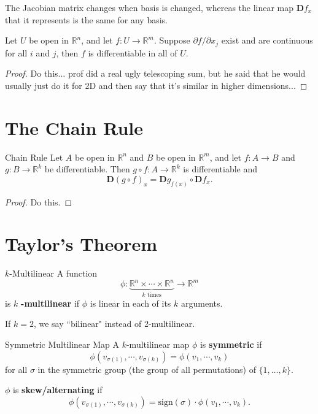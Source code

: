 \documentclass[10pt]{report}
\begin{document}
\begin{note}{}{}
The Jacobian matrix changes when basis is changed, whereas the linear map $\mathbf{D}f_x$ that it represents is the same for any basis.
\end{note}

\begin{thrm}{}{}
Let $U$ be open in $\mathbb{R}^n$, and let $f:U \to \mathbb{R}^m$. Suppose $\partial f / \partial x_j$ exist and are continuous for all $i$ and $j$, then $f$ is differentiable in all of $U$.
\end{thrm}
\begin{proof}
	{\color{red}Do this... prof did a real ugly telescoping sum, but he said that he would usually just do it for 2D and then say that it's similar in higher dimensions...}
\end{proof}


\section{The Chain Rule}

\begin{thrm}{Chain Rule}{}
Let $A$ be open in $\mathbb{R}^n$ and $B$ be open in $\mathbb{R}^m$, and let $f:A\to B$ and $g:B \to \mathbb{R}^k$ be differentiable. Then $g \circ f: A \to \mathbb{R}^k$ is differentiable and
\[
	\mathbf{D}(g \circ f)_x = \mathbf{D}g_{f(x)} \circ \mathbf{D}f_x.
\] 
\end{thrm}
\begin{proof}
	{\color{red}Do this.}
\end{proof}



\section{Taylor's Theorem}

\begin{defn}{$k$-Multilinear}{}
	A function \[\phi: \underbrace{\mathbb{R}^n \times \cdots \times \mathbb{R}^n}_{k \text{ times}} \to \mathbb{R}^m\] is $k$ \textbf{-multilinear} if $\phi$ is linear in each of its $k$ arguments.
\end{defn}

If $k=2$, we say ``bilinear" instead of 2-multilinear.

\begin{defn}{Symmetric Multilinear Map}{}
A $k$-multilinear map $\phi$ is \textbf{symmetric} if
\[
	\phi(v_{\sigma(1)}, \cdots, v_{\sigma(k)}) = \phi(v_1, \cdots, v_k)
\] for all $\sigma$ in the symmetric group (the group of all permutations) of $\{ 1, \dots, k\}$.

$\phi$ is \textbf{skew/alternating} if
\[
	\phi(v_{\sigma(1)}, \cdots, v_{\sigma(k)}) = \text{sign}(\sigma) \cdot \phi(v_1, \cdots, v_k).
\] 
\end{defn}
\end{document}
